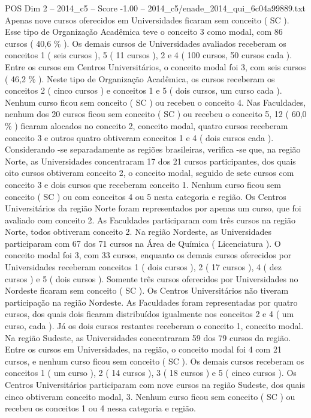 \begin{textsample}{POS Dim 2 – 2014\_c5 – Score -1.00 – 2014\_c5/enade\_2014\_qui\_6c04a99889.txt}
Apenas nove cursos oferecidos em Universidades ficaram sem conceito ( SC ).
Esse tipo de Organização Acadêmica teve o conceito 3 como modal, com 86 cursos ( 40,6 \% ).
Os demais cursos de Universidades avaliados receberam os conceitos 1 ( seis cursos ), 5 ( 11 cursos ), 2 e 4 ( 100 cursos, 50 cursos cada ).
Entre os cursos em Centros Universitários, o conceito modal foi 3, com seis cursos ( 46,2 \% ).
Neste tipo de Organização Acadêmica, os cursos receberam os conceitos 2 ( cinco cursos ) e conceitos 1 e 5 ( dois cursos, um curso cada ).
Nenhum curso ficou sem conceito ( SC ) ou recebeu o conceito 4.
Nas Faculdades, nenhum dos 20 cursos ficou sem conceito ( SC ) ou recebeu o conceito 5, 12 ( 60,0 \% ) ficaram alocados no conceito 2, conceito modal, quatro cursos receberam conceito 3 e outros quatro obtiveram conceitos 1 e 4 ( dois cursos cada ).
Considerando -se separadamente as regiões brasileiras, verifica -se que, na região Norte, as Universidades concentraram 17 dos 21 cursos participantes, dos quais oito cursos obtiveram conceito 2, o conceito modal, seguido de sete cursos com conceito 3 e dois cursos que receberam conceito 1.
Nenhum curso ficou sem conceito ( SC ) ou com conceitos 4 ou 5 nesta categoria e região.
Os Centros Universitários da região Norte foram representados por apenas um curso, que foi avaliado com conceito 2.
As Faculdades participaram com três cursos na região Norte, todos obtiveram conceito 2.
Na região Nordeste, as Universidades participaram com 67 dos 71 cursos na Área de Química ( Licenciatura ).
O conceito modal foi 3, com 33 cursos, enquanto os demais cursos oferecidos por Universidades receberam conceitos 1 ( dois cursos ), 2 ( 17 cursos ), 4 ( dez cursos ) e 5 ( dois cursos ).
Somente três cursos oferecidos por Universidades no Nordeste ficaram sem conceito ( SC ).
Os Centros Universitários não tiveram participação na região Nordeste.
As Faculdades foram representadas por quatro cursos, dos quais dois ficaram distribuídos igualmente nos conceitos 2 e 4 ( um curso, cada ).
Já os dois cursos restantes receberam o conceito 1, conceito modal.
Na região Sudeste, as Universidades concentraram 59 dos 79 cursos da região.
Entre os cursos em Universidades, na região, o conceito modal foi 4 com 21 cursos, e nenhum curso ficou sem conceito ( SC ).
Os demais cursos receberam os conceitos 1 ( um curso ), 2 ( 14 cursos ), 3 ( 18 cursos ) e 5 ( cinco cursos ).
Os Centros Universitários participaram com nove cursos na região Sudeste, dos quais cinco obtiveram conceito modal, 3.
Nenhum curso ficou sem conceito ( SC ) ou recebeu os conceitos 1 ou 4 nessa categoria e região.

\end{textsample}
